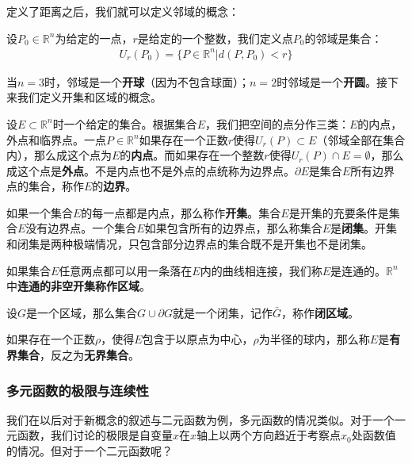 \documentclass{ctexart}
\let\oldtextbf\textbf %
\renewcommand{\textbf}[1]{\textcolor{btex}{\oldtextbf{#1}}} %
\begin{document}
定义了距离之后，我们就可以定义邻域的概念：
\begin{tcolorbox}[
    colback=bac2,     %
    colframe=fra2,   %
    coltitle=white,             %
    coltext=tex2,
    title=邻域的定义,
    fonttitle=\bfseries,        %
arc=3mm,                     %
breakable
]
设$P_0\in\mathbb{R}^n$为给定的一点，$r$是给定的一个整数，我们定义点$P_0$的邻域是集合：
\begin{align*}
    U_r(P_0)=\{ P\in\mathbb{R}^n|d(P,P_0)<r\}
\end{align*}
\end{tcolorbox}

当$n=3$时，邻域是一个\textbf{开球}（因为不包含球面）；$n=2$时邻域是一个\textbf{开圆}。接下来我们定义开集和区域的概念。

设$E\subset \mathbb{R}^n$时一个给定的集合。根据集合$E$，我们把空间的点分作三类：$E$的内点，外点和临界点。一点$P\in\mathbb{R}^n$如果存在一个正数$r$使得$U_r(P)\subset E$（邻域全部在集合内），那么成这个点为$E$的\textbf{内点}。而如果存在一个整数$r$使得$U_r(P)\cap E=\emptyset$，那么成这个点是\textbf{外点}。不是内点也不是外点的点统称为边界点。$\partial E$是集合$E$所有边界点的集合，称作$E$的\textbf{边界}。

如果一个集合$E$的每一点都是内点，那么称作\textbf{开集}。集合$E$是开集的充要条件是集合$E$没有边界点。一个集合$E$如果包含所有的边界点，那么称集合$E$是\textbf{闭集}。开集和闭集是两种极端情况，只包含部分边界点的集合既不是开集也不是闭集。

如果集合$E$任意两点都可以用一条落在$E$内的曲线相连接，我们称$E$是连通的。$\mathbb{R}^n$中\textbf{连通的非空开集称作区域}。

设$G$是一个区域，那么集合$G\cup\partial G$就是一个闭集，记作$\bar{G}$，称作\textbf{闭区域}。

如果存在一个正数$\rho$，使得$E$包含于以原点为中心，$\rho$为半径的球内，那么称$E$是\textbf{有界集合}，反之为\textbf{无界集合}。

\subsubsection{多元函数的极限与连续性}
我们在以后对于新概念的叙述与二元函数为例，多元函数的情况类似。对于一个一元函数，我们讨论的极限是自变量$x$在$x$轴上以两个方向趋近于考察点$x_0$处函数值的情况。但对于一个二元函数呢？
\end{document}
